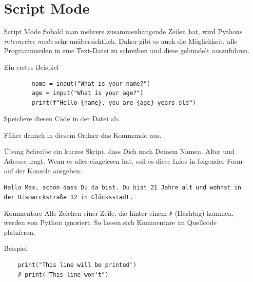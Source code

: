 \section{Script Mode}
\begin{frame}
\begin{block}{Script Mode}
	\vspace{2pt}
	Sobald man mehrere zusammenhängende Zeilen hat, wird Pythons \textit{interactive mode} sehr unübersichtlich. Daher gibt es auch die Möglichkeit, alle Programmzeilen in eine Text-Datei zu schreiben und diese gebündelt auszuführen.   
\end{block}

\end{frame}
\begin{fragile}[]
	\begin{exampleblock}{Ein erstes Beispiel}
		\begin{verbatim}
		name = input("What is your name?")
		age = input("What is your age?")
		print(f"Hello {name}, you are {age} years old") 
		\end{verbatim}
		
		Speichere diesen Code in der Datei  ab. 
		
		Führe danach in diesem Ordner das Kommando 
		 aus. 
	\end{exampleblock}
\end{fragile}

\begin{frame}{Übung}
	Schreibe ein kurzes Skript, dass Dich nach Deinem Namen, Alter und Adresse fragt. Wenn es alles eingelesen hat, soll es diese Infos in folgender Form auf der Konsole ausgeben: 	
	
	\texttt{Hallo Max, schön dass Du da bist. Du bist 21 Jahre alt und wohnst in der Bismarckstraße 12 in Glücksstadt.}
	
\end{frame}


\begin{fragile}
	
	\begin{block}{Kommentare}
		\vspace{2pt}
		Alle Zeichen einer Zeile, die hinter einem \texttt{\#} (Hashtag) kommen, werden von Python ignoriert.
		So lassen sich Kommentare im Quellcode platzieren. 
	\end{block}
	\vspace{12pt}
	\begin{exampleblock}{Beispiel}
	\begin{verbatim}
	print("This line will be printed")
	# print("This line won't") 
	\end{verbatim}
	\end{exampleblock}
	
\end{fragile}


